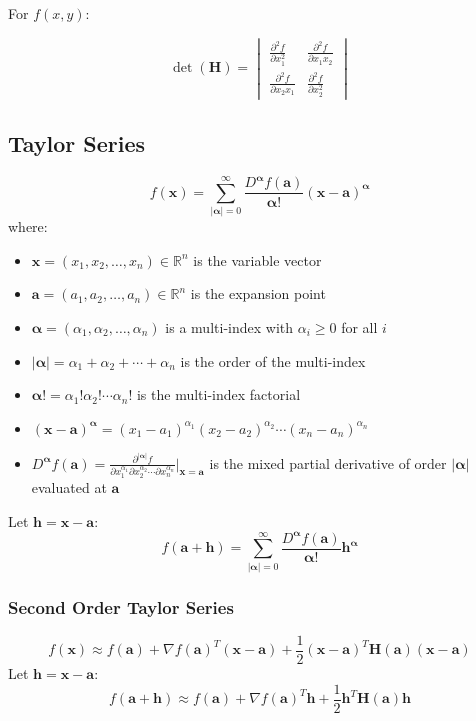 \documentclass{article}
\begin{document}
For $f(x, y)$:

\[
    \det(\mathbf{H}) = \begin{vmatrix}
        \frac{\partial^2 f}{\partial x_1^2} & \frac{\partial^2 f}{\partial x_1 x_2} \\
        \frac{\partial^2 f}{\partial x_2 x_1} & \frac{\partial^2 f}{\partial x_2^2}
    \end{vmatrix}
\]

\subsection{Taylor Series}

\[
    f(\mathbf{x}) = \sum_{|\boldsymbol{\alpha}|=0}^{\infty} \frac{D^{\boldsymbol{\alpha}} f(\mathbf{a})}{\boldsymbol{\alpha}!} (\mathbf{x} - \mathbf{a})^{\boldsymbol{\alpha}}
\]
where:
\begin{itemize}
    \item $\mathbf{x} = (x_1, x_2, \ldots, x_n) \in \mathbb{R}^n$ is the variable vector
    \item $\mathbf{a} = (a_1, a_2, \ldots, a_n) \in \mathbb{R}^n$ is the expansion point
    \item $\boldsymbol{\alpha} = (\alpha_1, \alpha_2, \ldots, \alpha_n)$ is a multi-index with $\alpha_i \geq 0$ for all $i$
    \item $|\boldsymbol{\alpha}| = \alpha_1 + \alpha_2 + \cdots + \alpha_n$ is the order of the multi-index
    \item $\boldsymbol{\alpha}! = \alpha_1! \alpha_2! \cdots \alpha_n!$ is the multi-index factorial
    \item $(\mathbf{x} - \mathbf{a})^{\boldsymbol{\alpha}} = (x_1 - a_1)^{\alpha_1} (x_2 - a_2)^{\alpha_2} \cdots (x_n - a_n)^{\alpha_n}$
    \item $D^{\boldsymbol{\alpha}} f(\mathbf{a}) = \frac{\partial^{|\boldsymbol{\alpha}|} f}{\partial x_1^{\alpha_1} \partial x_2^{\alpha_2} \cdots \partial x_n^{\alpha_n}}\bigg|_{\mathbf{x}=\mathbf{a}}$ is the mixed partial derivative of order $|\boldsymbol{\alpha}|$ evaluated at $\mathbf{a}$
\end{itemize}
Let $\mathbf{h} = \mathbf{x} - \mathbf{a}$:
\[
    f(\mathbf{a} + \mathbf{h}) = \sum_{|\boldsymbol{\alpha}|=0}^{\infty} \frac{D^{\boldsymbol{\alpha}} f(\mathbf{a})}{\boldsymbol{\alpha}!} \mathbf{h}^{\boldsymbol{\alpha}}
\]

\subsubsection{Second Order Taylor Series}
\[
    f(\mathbf{x}) \approx f(\mathbf{a}) + \nabla f(\mathbf{a})^T (\mathbf{x}-\mathbf{a}) + \frac{1}{2} (\mathbf{x}-\mathbf{a})^T \mathbf{H}(\mathbf{a}) (\mathbf{x}-\mathbf{a})
\]
Let $\mathbf{h} = \mathbf{x} - \mathbf{a}$:
\[
    f(\mathbf{a} + \mathbf{h}) \approx f(\mathbf{a}) + \nabla f(\mathbf{a})^T \mathbf{h} + \frac{1}{2} \mathbf{h}^T \mathbf{H}(\mathbf{a}) \mathbf{h}
\]
\end{document}
